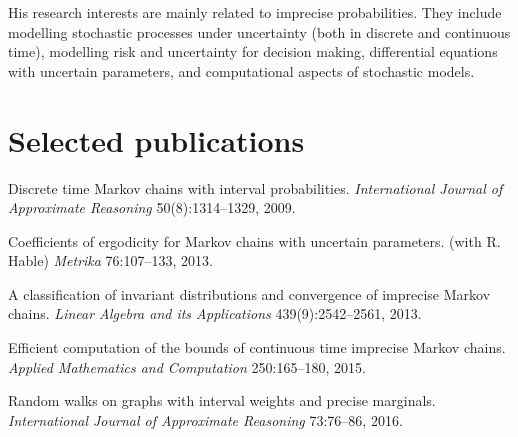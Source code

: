 \documentclass[overlapped,line,letterpaper]{res}
\begin{document}
\begin{resume}
		His research interests are mainly related to imprecise probabilities. They include modelling stochastic processes under uncertainty (both in discrete and continuous time), modelling risk and uncertainty for decision making, differential equations with uncertain parameters, and computational aspects of stochastic models.  
		
		
		
		
		
			
		\section{\bf Selected publications}

\vspace{10pt}
		
		Discrete time Markov chains with interval probabilities. {\em International Journal of Approximate Reasoning} 50(8):1314--1329, 2009.
		
		Coefficients of ergodicity for Markov chains with uncertain parameters. (with R. Hable) {\em Metrika} 76:107--133, 2013.
		
		A classification of invariant distributions and convergence of imprecise Markov chains.  {\em  Linear Algebra and its Applications} 439(9):2542--2561, 2013.
		
		Efficient computation of the bounds of continuous time imprecise Markov chains. {\em  Applied Mathematics and Computation} 250:165--180, 2015. 
		
		Random walks on graphs with interval weights and precise marginals. {\em International Journal of Approximate Reasoning} 73:76--86, 2016.		
	\end{resume}
	
\end{document}
